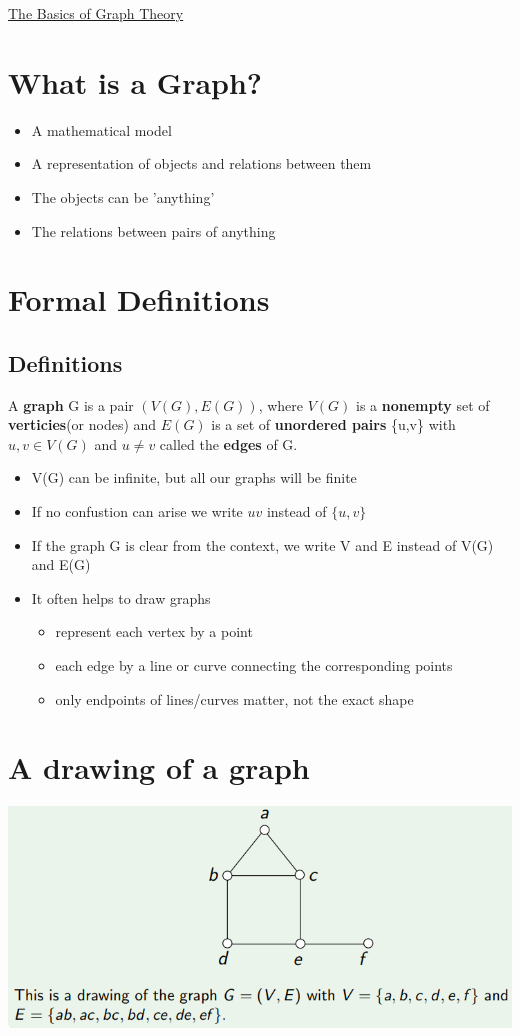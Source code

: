 \documentclass{article}[18pt]
\begin{document}
\begin{center}
\underline{\huge The Basics of Graph Theory}
\end{center}
\section{What is a Graph?}
\begin{itemize}
	\item A mathematical model
	\item A representation of objects and relations between them
	\item The objects can be 'anything'
	\item The relations between pairs of anything
\end{itemize}
\section{Formal Definitions}
\subsection{Definitions}
A \textbf{graph} G is a pair $(V(G),E(G))$, where $V(G)$ is a \textbf{nonempty} set of \textbf{verticies}(or nodes) and $E(G)$ is a set of \textbf{unordered pairs} \{u,v\} with $u,v\in V(G)$ and $u\neq v$ called the \textbf{edges} of G.
\begin{itemize}
	\item V(G) can be infinite, but all our graphs will be finite
	\item If no confustion can arise we write $uv$ instead of $\{u,v\}$
	\item If the graph G is clear from the context, we write V and E instead of V(G) and E(G)
	\item It often helps to draw graphs
	\begin{itemize}
		\item represent each vertex by a point
		\item each edge by a line or curve connecting the corresponding points
		\item only endpoints of lines/curves matter, not the exact shape
	\end{itemize}
\end{itemize}
\section{A drawing of a graph}
\includegraphics[scale=0.7]{drawing}
\end{document}
